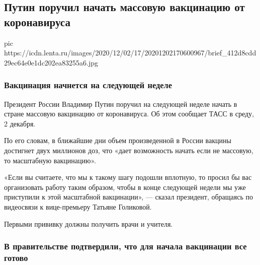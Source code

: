  
 
 
 
 
 
\subsection{Путин поручил начать массовую вакцинацию от коронавируса}
\label{sec:03_12_2020.news.ru.lenta_ru.2.putin_vaccination_start}

\ifcmt
pic https://icdn.lenta.ru/images/2020/12/02/17/20201202170600967/brief_412d8cdd29ec64e0e1dc202ea83255a6.jpg
\fi


\subsubsection{Вакцинация начнется на следующей неделе}

Президент России Владимир Путин поручил на следующей неделе начать в стране
массовую вакцинацию от коронавируса. Об этом сообщает ТАСС в среду, 2 декабря.

По его словам, в ближайшие дни объем произведенной в России вакцины достигнет
двух миллионов доз, что «дает возможность начать если не массовую, то
масштабную вакцинацию».

«Если вы считаете, что мы к такому шагу подошли вплотную, то просил бы вас
организовать работу таким образом, чтобы в конце следующей недели мы уже
приступили к этой масштабной вакцинации», — сказал президент, обращаясь по
видеосвязи к вице-премьеру Татьяне Голиковой.

Первыми прививку должны получить врачи и учителя.

\subsubsection{В правительстве подтвердили, что для начала вакцинации все готово}

